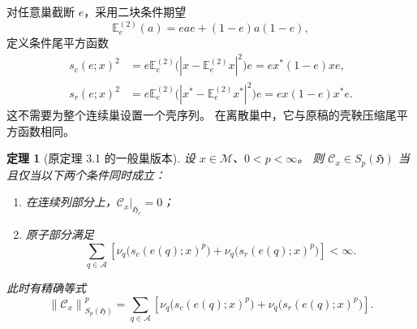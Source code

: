 \documentclass[UTF8,11pt,a4paper,fontset=fandol]{ctexart}
\newtheorem{theorem}{定理}[section]
\theoremstyle{remark}
\numberwithin{equation}{section}
\newcommand{\M}{\mathcal M}
\newcommand{\CC}{\mathcal C}
\newcommand{\E}{\mathbb E}
\newcommand{\HH}{\mathfrak H}
\newcommand{\norm}[1]{\left\lVert #1\right\rVert}
\begin{document}
对任意巢截断 $e$，采用二块条件期望
\[
 \E_e^{(2)}(a)=eae+(1-e)a(1-e),
\]
定义条件尾平方函数
\begin{align}
 s_c(e;x)^2
 &=e\E_e^{(2)}\bigl(|x-\E_e^{(2)}x|^2\bigr)e
   =ex^*(1-e)xe,\label{eq:tail-c}\\
 s_r(e;x)^2
 &=e\E_e^{(2)}\bigl(|x^*-\E_e^{(2)}x^*|^2\bigr)e
   =ex(1-e)x^*e.\label{eq:tail-r}
\end{align}
这不需要为整个连续巢设置一个壳序列。
在离散巢中，它与原稿的壳鞅压缩尾平方函数相同。

\begin{theorem}[原定理 3.1 的一般巢版本]\label{thm:schatten}
设 $x\in\M$、$0<p<\infty$。
则 $\CC_x\in S_p(\HH)$ 当且仅当以下两个条件同时成立：
\begin{enumerate}[label=\textup{(\roman*)}]
 \item 在连续列部分上，$\CC_x|_{\HH_c}=0$；
 \item 原子部分满足
 \begin{equation}\label{eq:schatten-condition}
 \sum_{q\in\mathscr A}\left[
   \nu_q\bigl(s_c(e(q);x)^p\bigr)
  +\nu_q\bigl(s_r(e(q);x)^p\bigr)\right]<\infty.
 \end{equation}
\end{enumerate}
此时有精确等式
\begin{equation}\label{eq:schatten-norm}
 \boxed{\quad
 \norm{\CC_x}_{S_p(\HH)}^p
 =\sum_{q\in\mathscr A}\left[
   \nu_q\bigl(s_c(e(q);x)^p\bigr)
  +\nu_q\bigl(s_r(e(q);x)^p\bigr)\right].
 \quad}
\end{equation}
\end{theorem}
\end{document}
